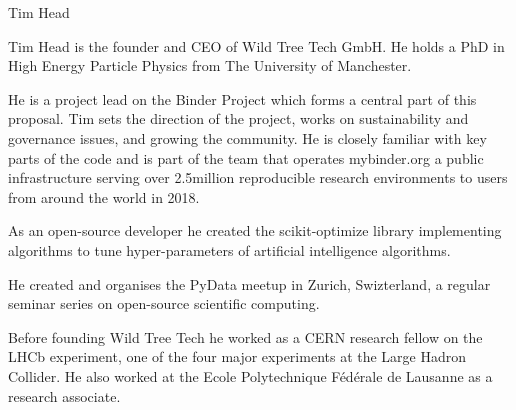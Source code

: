\begin{participant}[type=leadPI,PM=12,gender=male]{Tim Head}


  Tim Head is the founder and CEO of Wild Tree Tech GmbH. He holds a PhD in
  High Energy Particle Physics from The University of Manchester.

  He is a project lead on the Binder Project which forms a central part of
  this proposal. Tim sets the direction of the project, works on sustainability
  and governance issues, and growing the community. He is closely familiar
  with key parts of the code and is part of the team that operates mybinder.org
  a public infrastructure serving over 2.5million reproducible research
  environments to users from around the world in 2018.

  As an open-source developer he created the scikit-optimize library implementing
  algorithms to tune hyper-parameters of artificial intelligence algorithms.

  He created and organises the PyData meetup in Zurich, Swizterland,
  a regular seminar series on open-source scientific computing.

  Before founding Wild Tree Tech he worked as a CERN research fellow on the
  LHCb experiment, one of the four major experiments at the Large Hadron
  Collider. He also worked at the Ecole Polytechnique Fédérale de Lausanne as
  a research associate.
\end{participant}

